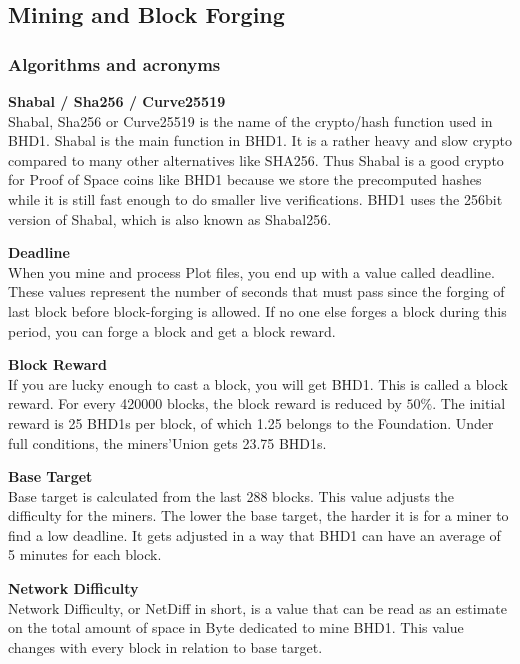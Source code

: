 \subsection{Mining and Block Forging}
\subsubsection{Algorithms and acronyms}
\begin{flushleft}
    \textbf{Shabal / Sha256 / Curve25519}\\
    Shabal, Sha256 or Curve25519 is the name of the crypto/hash function used in BHD1. Shabal is the main function in BHD1. It is a rather heavy and slow crypto compared to many other alternatives like SHA256. Thus Shabal is a good crypto for Proof of Space coins like BHD1 because we store the precomputed hashes while it is still fast enough to do smaller live verifications. BHD1 uses the 256bit version of Shabal, which is also known as Shabal256.
\end{flushleft}
\begin{flushleft}
    \textbf{Deadline}\\
    When you mine and process Plot files, you end up with a value called deadline. These values represent the number of seconds that must pass since the forging of last block before block-forging is allowed. If no one else forges a block during this period, you can forge a block and get a block reward.
\end{flushleft}
\begin{flushleft}
    \textbf{Block Reward}\\
    If you are lucky enough to cast a block, you will get BHD1. This is called a block reward. For every 420000 blocks, the block reward is reduced by $50\%$. The initial reward is 25 BHD1s per block, of which 1.25 belongs to the Foundation. Under full conditions, the miners'Union gets 23.75 BHD1s.
\end{flushleft}
\begin{flushleft}
    \textbf{Base Target}\\
    Base target is calculated from the last 288 blocks. This value adjusts the difficulty for the miners. The lower the base target, the harder it is for a miner to find a low deadline. It gets adjusted in a way that BHD1 can have an average of 5 minutes for each block.
\end{flushleft}
\begin{flushleft}
    \textbf{Network Difficulty}\\
    Network Difficulty, or NetDiff in short, is a value that can be read as an estimate on the total amount of space in Byte dedicated to mine BHD1. This value changes with every block in relation to base target.
\end{flushleft}
